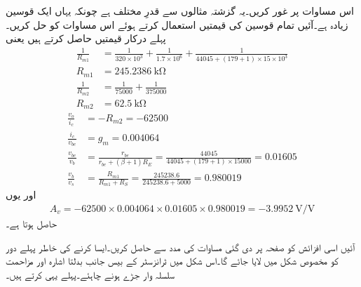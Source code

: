 اس مساوات پر غور کریں۔یہ گزشتہ مثالوں سے قدرِ مختلف ہے چونکہ یہاں ایک قوسین زیادہ ہے۔آئیں تمام قوسین کی قیمتیں استعمال کرتے ہوئے اس مساوات کو حل کریں۔پہلے درکار قیمتیں حاصل کرتے ہیں یعنی
\begin{align*}
\frac{1}{R_{m1}}&=\frac{1}{320 \times 10^{3}}+\frac{1}{1.7 \times 10^6 } +\frac{1}{44045+(179+1) \times 15 \times 10^3}\\
R_{m1}&=\SI{245.2386}{\kilo \ohm}\\
\frac{1}{R_{m2}}&=\frac{1}{75000}+\frac{1}{375000}\\
R_{m2}&=\SI{62.5}{\kilo \ohm}
\end{align*}
\begin{align*}
\frac{v_o}{i_c}&=-R_{m2}=\num{-62500}\\
\frac{i_c}{v_{be}}&=g_m=\num{0.004064}\\
\frac{v_{be}}{v_b}&=\frac{r_{be}}{r_{be}+(\beta+1)R_E}=\frac{44045}{44045+(179+1) \times 15000}=\num{0.01605}\\
\frac{v_b}{v_s}&=\frac{R_{m1}}{R_{m1}+R_S}=\frac{245238.6}{245238.6+5000}=\num{0.980019}
\end{align*}
اور یوں
\begin{align*}
A_v=-62500 \times 0.004064 \times 0.01605 \times 0.980019 =\SI{-3.9952}{\volt \per \volt}
\end{align*}
حاصل ہوتا ہے۔

آئیں اسی افزائش کو صفحہ  پر  دی گئی  مساوات  کی مدد سے حاصل کریں۔ایسا کرنے کی خاطر پہلے دور کو مخصوص شکل میں لایا جائے گا۔اس شکل میں ٹرانزسٹر کے بیس جانب بدلتا اشارہ اور مزاحمت سلسلہ وار جڑے ہونے چاہئے۔پہلے یہی کرتے ہیں۔

